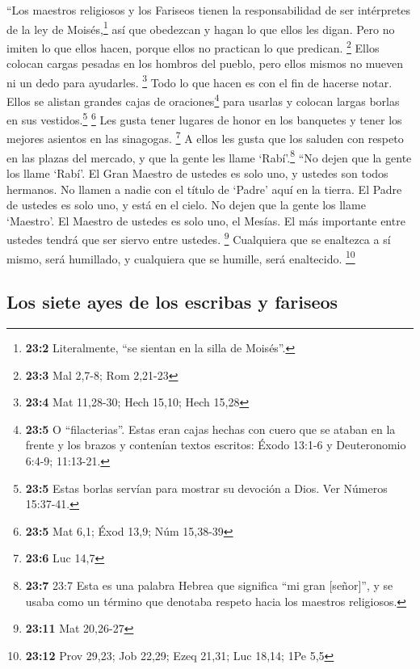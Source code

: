  ``Los maestros religiosos y los Fariseos tienen la
responsabilidad de ser intérpretes de la ley de Moisés,\footnote{\textbf{23:2}
  Literalmente, ``se sientan en la silla de Moisés''.} 
así que obedezcan y hagan lo que ellos les digan. Pero no imiten lo que
ellos hacen, porque ellos no practican lo que predican. \footnote{\textbf{23:3}
  Mal 2,7-8; Rom 2,21-23}  Ellos colocan cargas pesadas en
los hombros del pueblo, pero ellos mismos no mueven ni un dedo para
ayudarles. \footnote{\textbf{23:4} Mat 11,28-30; Hech 15,10; Hech 15,28}
 Todo lo que hacen es con el fin de hacerse notar. Ellos
se alistan grandes cajas de oraciones\footnote{\textbf{23:5} O
  ``filacterias''. Estas eran cajas hechas con cuero que se ataban en la
  frente y los brazos y contenían textos escritos: Éxodo 13:1-6 y
  Deuteronomio 6:4-9; 11:13-21.} para usarlas y colocan largas borlas en
sus vestidos.\footnote{\textbf{23:5} Estas borlas servían para mostrar
  su devoción a Dios. Ver Números 15:37-41.} \footnote{\textbf{23:5} Mat
  6,1; Éxod 13,9; Núm 15,38-39}  Les gusta tener lugares
de honor en los banquetes y tener los mejores asientos en las sinagogas.
\footnote{\textbf{23:6} Luc 14,7}  A ellos les gusta que
los saluden con respeto en las plazas del mercado, y que la gente les
llame `Rabí'.\footnote{\textbf{23:7} 23:7 Esta es una palabra Hebrea que
  significa ``mi gran {[}señor{]}'', y se usaba como un término que
  denotaba respeto hacia los maestros religiosos.}  ``No
dejen que la gente los llame `Rabí'. El Gran Maestro de ustedes es solo
uno, y ustedes son todos hermanos.  No llamen a nadie con
el título de `Padre' aquí en la tierra. El Padre de ustedes es solo uno,
y está en el cielo.  No dejen que la gente los llame
`Maestro'. El Maestro de ustedes es solo uno, el Mesías. 
El más importante entre ustedes tendrá que ser siervo entre ustedes.
\footnote{\textbf{23:11} Mat 20,26-27}  Cualquiera que se
enaltezca a sí mismo, será humillado, y cualquiera que se humille, será
enaltecido. \footnote{\textbf{23:12} Prov 29,23; Job 22,29; Ezeq 21,31;
  Luc 18,14; 1Pe 5,5}

\hypertarget{los-siete-ayes-de-los-escribas-y-fariseos}{%
\subsection{Los siete ayes de los escribas y
fariseos}\label{los-siete-ayes-de-los-escribas-y-fariseos}}

